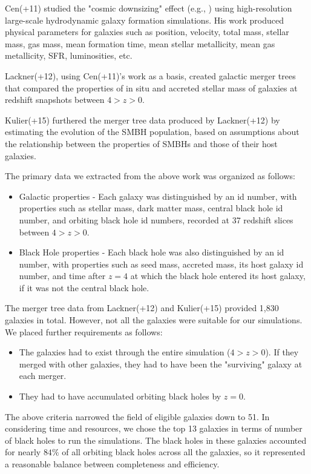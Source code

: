 \documentclass[english, apj]{emulateapj}
\begin{document}
Cen(+11) studied the "cosmic downsizing" effect (e.g., \citet{1996AJ....112..839C}) using high-resolution large-scale hydrodynamic galaxy formation simulations.  His work produced physical parameters for galaxies such as position, velocity, total mass, stellar mass, gas mass, mean formation time, mean stellar metallicity, mean gas metallicity, SFR, luminosities, etc.

Lackner(+12), using Cen(+11)'s work as a basis, created galactic merger trees that compared the properties of in situ and accreted stellar mass of galaxies at redshift snapshots between $4 > z > 0$.

Kulier(+15) furthered the merger tree data produced by Lackner(+12) by estimating the evolution of the SMBH population, based on assumptions about the relationship between the properties of SMBHs and those of their host galaxies.

The primary data we extracted from the above work was organized as follows:
\begin{itemize}
    \item Galactic properties - Each galaxy was distinguished by an id number, with properties such as stellar mass, dark matter mass, central black hole id number, and orbiting black hole id numbers, recorded at 37 redshift slices between $4 > z > 0$.
    \item Black Hole properties - Each black hole was also distinguished by an id number, with properties such as seed mass, accreted mass, its host galaxy id number, and time after $z=4$ at which the black hole entered its host galaxy, if it was not the central black hole.
\end{itemize}

The merger tree data from Lackner(+12) and Kulier\-(+15) provided 1,830 galaxies in total.  However, not all the galaxies were suitable for our simulations.  We placed further requirements as follows:
\begin{itemize}
\item The galaxies had to exist through the entire simulation ($4 > z > 0$).  If they merged with other galaxies, they had to have been the "surviving" galaxy at each merger.
\item They had to have accumulated orbiting black holes by $z = 0$.
\end{itemize}

The above criteria narrowed the field of eligible galaxies down to 51.  In considering time and resources, we chose the top 13 galaxies in terms of number of black holes to run the simulations.  The black holes in these galaxies accounted for nearly $84{\%}$ of all orbiting black holes across all the galaxies, so it represented a reasonable balance between completeness and efficiency.
\end{document}
